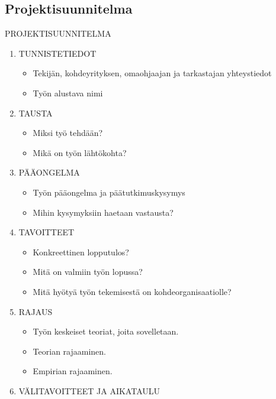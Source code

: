 \documentclass{LUT_pohja}[2016/03/09 LUT Dippa Pohja]
\begin{document}
\newpage
\begin{appendices}


\appendix %

\section{Projektisuunnitelma}
\addtocounter{page}{1}%
\MakeUppercase{PROJEKTISUUNNITELMA}
\value{chapter}
\begin{enumerate}[1.,noitemsep, nolistsep, topsep=-1em]
\item \MakeUppercase{tunnistetiedot}
 \begin{itemize}[ ]
 \item Tekijän, kohdeyrityksen, omaohjaajan ja tarkastajan yhteystiedot 
 \item Työn alustava nimi
 \end{itemize}
\item \MakeUppercase{tausta}
\begin{itemize}[ ]
 \item Miksi työ tehdään? 
 \item Mikä on työn lähtökohta?
 \end{itemize}
\item \MakeUppercase{PÄÄONGELMA}
 \begin{itemize}[ ]
  \item Työn pääongelma ja päätutkimuskysymys 
  \item Mihin kysymyksiin haetaan vastausta?
  \end{itemize}
\item \MakeUppercase{TAVOITTEET}
  \begin{itemize}[ ]
  \item Konkreettinen lopputulos?   
  \item Mitä on valmiin työn lopussa?
  \item Mitä hyötyä työn tekemisestä on kohdeorganisaatiolle?
  \end{itemize}
\item \MakeUppercase{RAJAUS}
  \begin{itemize}[ ]
  \item Työn keskeiset teoriat, joita sovelletaan. 
  \item Teorian rajaaminen.
  \item Empirian rajaaminen.
  \end{itemize}
\item \MakeUppercase{VÄLITAVOITTEET JA AIKATAULU}

\end{enumerate}
\end{appendices}
\end{document}
